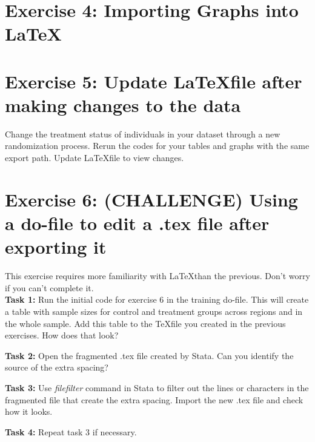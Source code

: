 \documentclass[12pts]{report}
\begin{document}
\section*{Exercise 4: Importing Graphs into \LaTeX}

\section*{Exercise 5: Update \LaTeX\space file after making changes to the data}
Change the treatment status of individuals in your dataset through a new randomization process. Rerun the codes for your tables and graphs with the same export path. Update \LaTeX file to view changes.

\section*{Exercise 6: (CHALLENGE) Using a do-file to edit a .tex file after exporting it}

This exercise requires more familiarity with \LaTeX than the previous. Don't worry if you can't complete it. \\

\textbf{Task 1:} Run the initial code for exercise 6 in the training do-file. This will create a table with sample sizes for control and treatment groups across regions and in the whole sample. Add this table to the \TeX\space file you created in the previous exercises. How does that look?

\textbf{Task 2:} Open the fragmented .tex file created by Stata. Can you identify the source of the extra spacing?

\textbf{Task 3:} Use \textit{filefilter} command in Stata to filter out the lines or characters in the fragmented file that create the extra spacing. Import the new .tex file and check how it looks.

\textbf{Task 4:} Repeat task 3 if necessary.
\end{document}

